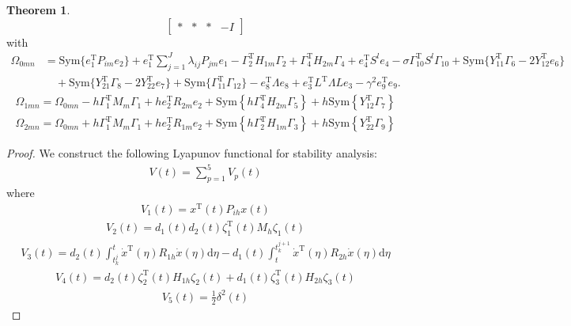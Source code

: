\documentclass[preprint,review,fleqn,sort&compress,3p]{elsarticle}
\theoremstyle{definition} %
\theoremstyle{definition}%
\newtheorem{thm}{Theorem}[section]
\begin{document}
\begin{thm}
\begin{equation}
\begin{bmatrix}
				* & * & * & -I 
			\end{bmatrix}
		\end{equation}
		with
		\begin{align*}
			\Omega_{0mn}
			&= \mathrm{Sym}\{e_1^{\mathrm{T}}P_{im}e_2\}
			+e_1^{\mathrm{T}}\sum_{j=1}^{J}\lambda_{ij}P_{jm}e_1
			-\Gamma_2^{\mathrm{T}}H_{1m}\Gamma_2
			+\Gamma_4^{\mathrm{T}}H_{2m}\Gamma_4
			+e_4^{\mathrm{T}}S^le_4
			-\sigma\Gamma_{10}^{\mathrm{T}}S^l\Gamma_{10}
			+\mathrm{Sym}\{Y_{11}^{\mathrm{T}}\Gamma_6-2Y_{12}^{\mathrm{T}}e_6\}
			\\
			&\quad
			+\mathrm{Sym}\{Y_{21}^{\mathrm{T}}\Gamma_8-2Y_{22}^{\mathrm{T}}e_7\}
			+\mathrm{Sym}\{\Gamma_{11}^{\mathrm{T}}\Gamma_{12}\}
			-e_8^{\mathrm{T}}\Lambda e_8
			+e_3^{\mathrm{T}}L^{\mathrm{T}}\Lambda Le_3
			-\gamma^2e_9^{\mathrm{T}}e_9 .
		\end{align*}
		\begin{align*}
			\Omega_{1mn} =   \Omega_{0mn}
			-h \Gamma_{1}^{\mathrm{T}}{M}_{m}
			\Gamma_{1}
			+ h e_{2}^{\mathrm{T}} R_{2m} e_{2}
			+  \mathrm{Sym} \left\{ 
			h\Gamma_{4}^{\mathrm{T}} H_{2m} \Gamma_{5} \right\}
			+h \mathrm{Sym} \left\{ 
			Y_{12}^{\mathrm{T}}\Gamma_{7}
			\right\}
		\end{align*}
		\begin{align*}
			\Omega_{2mn} = \Omega_{0mn} 
			+h \Gamma_{1}^{\mathrm{T}}{M}_{m}
			\Gamma_{1}
			+he_{2}^{\mathrm{T}} R_{1m} e_{2}
			+\mathrm{Sym} \left\{ 
			h\Gamma_{2}^{\mathrm{T}} H_{1m} \Gamma_{3} \right\}
			+h \mathrm{Sym} \left\{ 
			Y_{22}^{\mathrm{T}}\Gamma_{9}
			\right\}
		\end{align*}
		
		\begin{proof} 
			We construct the following Lyapunov functional for stability analysis:
			\begin{align}\label{V}
				V(t) =\sum_{p=1}^{5} V_p(t)
			\end{align}
			where 
			\begin{align}
				V_1(t) = x^{\mathrm{T}}(t)P_{ih}x(t)
			\end{align}
			\begin{align}
				V_2(t) = d_1(t) d_2(t)
				\zeta_1^{\mathrm{T}}(t)
				M_{h} \zeta_1(t)
			\end{align}
			\begin{align}
				V_3(t) = 
				d_2(t) \int_{t_k^j}^{t} \dot{x}^\mathrm{T}(\eta) R_{1h} \dot{x}(\eta) \mathrm{d}\eta 
				- d_1(t) \int_{t}^{t_{k}^{j+1}} \dot{x}^\mathrm{T}(\eta) R_{2h} \dot{x}(\eta) \mathrm{d}\eta
			\end{align}
			\begin{align}
				V_4(t) = d_2(t) \zeta_2^{\mathrm{T}}(t) H_{1h} \zeta_2(t) + d_1(t) \zeta_3^{\mathrm{T}}(t) H_{2h} \zeta_3(t)
			\end{align}
			\begin{align}
				V_5(t) = \frac{1}{2} \delta^2(t)
			\end{align}
			

\end{proof}
\end{thm}
\end{document}
